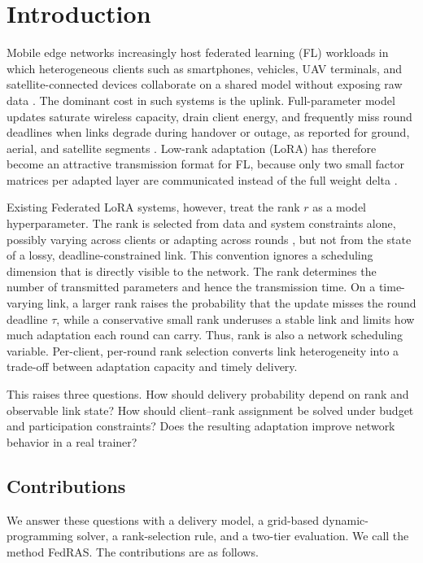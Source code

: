 \documentclass[preprint,12pt]{elsarticle}
\begin{document}
\section{Introduction}
\label{sec:intro}

Mobile edge networks increasingly host federated learning (FL) workloads in which heterogeneous clients such as smartphones, vehicles, UAV terminals, and satellite-connected devices collaborate on a shared model without exposing raw data \cite{mcmahan2017fedavg,kairouz2021advances,liu2018sagin,mahboob2024ntn}. The dominant cost in such systems is the uplink. Full-parameter model updates saturate wireless capacity, drain client energy, and frequently miss round deadlines when links degrade during handover or outage, as reported for ground, aerial, and satellite segments \cite{razmi2022ground,tang2023flsagin,qin2024dfrl,ribero2023intermittent}. Low-rank adaptation (LoRA) has therefore become an attractive transmission format for FL, because only two small factor matrices per adapted layer are communicated instead of the full weight delta \cite{hu2022lora,babakniya2023slora,zhang2024fedit}.

Existing Federated LoRA systems, however, treat the rank $r$ as a model hyperparameter. The rank is selected from data and system constraints alone, possibly varying across clients \cite{cho2024hetlora,fan2025helora} or adapting across rounds \cite{wu2026fedara,yang2024safedlora}, but not from the state of a lossy, deadline-constrained link. This convention ignores a scheduling dimension that is directly visible to the network. The rank determines the number of transmitted parameters and hence the transmission time. On a time-varying link, a larger rank raises the probability that the update misses the round deadline $\tau$, while a conservative small rank underuses a stable link and limits how much adaptation each round can carry. Thus, rank is also a network scheduling variable. Per-client, per-round rank selection converts link heterogeneity into a trade-off between adaptation capacity and timely delivery.

This raises three questions. How should delivery probability depend on rank and observable link state? How should client--rank assignment be solved under budget and participation constraints? Does the resulting adaptation improve network behavior in a real trainer?

\subsection{Contributions}
We answer these questions with a delivery model, a grid-based dynamic-programming solver, a rank-selection rule, and a two-tier evaluation. We call the method FedRAS. The contributions are as follows.
\end{document}
